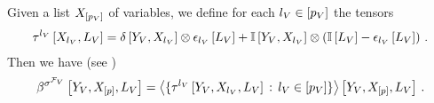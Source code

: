 \begin{theorem}
    \label{the:varSelectorDecomposition}
    Given a list $X_{[p_{V}]}$ of variables, we define for each $l_{V}\in[p_{V}]$ the tensors
    \begin{align*}
        \tau^{{l_{V}}}\left[X_{l_{V}},L_{V}\right]
        = \delta\left[Y_{V},X_{l_{V}}\right] \otimes \epsilon_{l_{V}}\left[L_{V}\right]
        + \mathbb{I}\left[Y_{V},X_{l_{V}}\right]
        \otimes \left(\mathbb{I}\left[L_{V}\right] - \epsilon_{l_{V}}\left[L_{V}\right] \right) \, .
    \end{align*}
    Then we have (see )
    \begin{align*}
        \beta^{\sigma^{\mathcal{F}_{V}}}\left[Y_{V},X_{[p]},L_{V}\right]
    = \left\langle 
        \{\tau^{{l_{V}}}\left[Y_{V},X_{l_{V}},L_{V}\right] \,:\, l_{V}\in[p_{V}]\}
    \right\rangle \left[ Y_{V},X_{[p]},L_{V} \right] \, .
    \end{align*}
\end{theorem}
